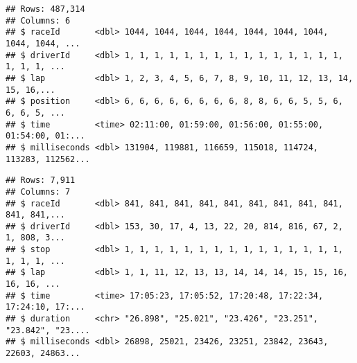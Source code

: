 \documentclass[
]{article}
\newenvironment{Shaded}{\begin{snugshade}}{\end{snugshade}}
\newcommand{\KeywordTok}[1]{\textcolor[rgb]{0.13,0.29,0.53}{\textbf{#1}}}
\newcommand{\NormalTok}[1]{#1}
\newcommand{\OperatorTok}[1]{\textcolor[rgb]{0.81,0.36,0.00}{\textbf{#1}}}
\newcommand{\StringTok}[1]{\textcolor[rgb]{0.31,0.60,0.02}{#1}}
\begin{document}
\begin{Shaded}
\end{Shaded}

\begin{verbatim}
## Rows: 487,314
## Columns: 6
## $ raceId       <dbl> 1044, 1044, 1044, 1044, 1044, 1044, 1044, 1044, 1044, ...
## $ driverId     <dbl> 1, 1, 1, 1, 1, 1, 1, 1, 1, 1, 1, 1, 1, 1, 1, 1, 1, 1, ...
## $ lap          <dbl> 1, 2, 3, 4, 5, 6, 7, 8, 9, 10, 11, 12, 13, 14, 15, 16,...
## $ position     <dbl> 6, 6, 6, 6, 6, 6, 6, 6, 8, 8, 6, 6, 5, 5, 6, 6, 6, 5, ...
## $ time         <time> 02:11:00, 01:59:00, 01:56:00, 01:55:00, 01:54:00, 01:...
## $ milliseconds <dbl> 131904, 119881, 116659, 115018, 114724, 113283, 112562...
\end{verbatim}

\begin{Shaded}
\end{Shaded}

\begin{verbatim}
## Rows: 7,911
## Columns: 7
## $ raceId       <dbl> 841, 841, 841, 841, 841, 841, 841, 841, 841, 841, 841,...
## $ driverId     <dbl> 153, 30, 17, 4, 13, 22, 20, 814, 816, 67, 2, 1, 808, 3...
## $ stop         <dbl> 1, 1, 1, 1, 1, 1, 1, 1, 1, 1, 1, 1, 1, 1, 1, 1, 1, 1, ...
## $ lap          <dbl> 1, 1, 11, 12, 13, 13, 14, 14, 14, 15, 15, 16, 16, 16, ...
## $ time         <time> 17:05:23, 17:05:52, 17:20:48, 17:22:34, 17:24:10, 17:...
## $ duration     <chr> "26.898", "25.021", "23.426", "23.251", "23.842", "23....
## $ milliseconds <dbl> 26898, 25021, 23426, 23251, 23842, 23643, 22603, 24863...
\end{verbatim}
\end{document}
